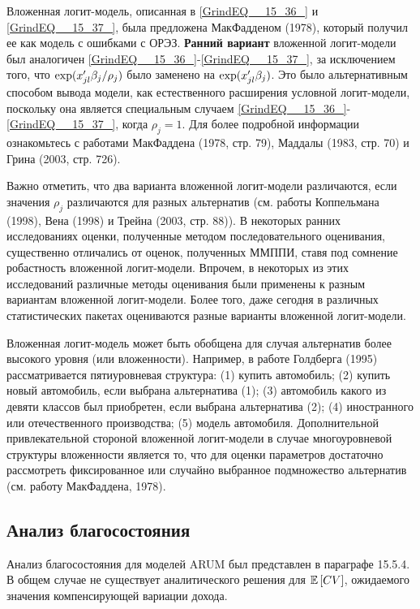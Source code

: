 Вложенная логит-модель, описанная в \eqref{GrindEQ__15_36_} и \eqref{GrindEQ__15_37_}, была предложена МакФадденом (1978), который получил ее как модель с ошибками с ОРЭЗ. \textbf{Ранний вариант } вложенной логит-модели был аналогичен \eqref{GrindEQ__15_36_}-\eqref{GrindEQ__15_37_}, за исключением того, что ${\rm exp}(x'_{jl}{\beta }_j/{\rho }_j)$ было заменено на ${\rm exp}(x'_{jl}{\beta }_j)$. Это было альтернативным способом вывода модели, как естественного расширения условной логит-модели, поскольку она является специальным случаем \eqref{GrindEQ__15_36_}-\eqref{GrindEQ__15_37_}, когда ${\rho }_j=1.$ Для более подробной информации ознакомьтесь с работами МакФаддена (1978, стр. 79), Маддалы (1983, стр. 70) и Грина (2003, стр. 726).

Важно отметить, что два варианта вложенной логит-модели различаются, если значения ${\rho }_j$ различаются для разных альтернатив (см. работы Коппельмана (1998), Вена (1998) и Трейна (2003, стр. 88)). В некоторых ранних исследованиях оценки, полученные методом последовательного оценивания, существенно отличались от оценок, полученных ММППИ, ставя под сомнение робастность вложенной логит-модели. Впрочем, в некоторых из этих исследований различные методы оценивания были применены к разным вариантам вложенной логит-модели. Более того, даже сегодня в различных статистических пакетах оцениваются разные варианты вложенной логит-модели.

Вложенная логит-модель может быть обобщена для случая альтернатив более высокого уровня (или вложенности). Например, в работе Голдберга (1995) рассматривается пятиуровневая структура: (1) купить автомобиль; (2) купить новый автомобиль, если выбрана альтернатива (1); (3) автомобиль какого из девяти классов был приобретен, если выбрана альтернатива (2); (4) иностранного или отечественного производства; (5) модель автомобиля. Дополнительной привлекательной стороной вложенной логит-модели в случае многоуровневой структуры вложенности является то, что для оценки параметров достаточно рассмотреть фиксированное или случайно выбранное подмножество альтернатив (см. работу МакФаддена, 1978).

\subsection{Анализ благосостояния}

Анализ благосостояния для моделей ARUM был представлен в параграфе 15.5.4. В общем случае не существует аналитического решения для $\mathbb{E}\left[CV\right]$, ожидаемого значения компенсирующей вариации дохода.

